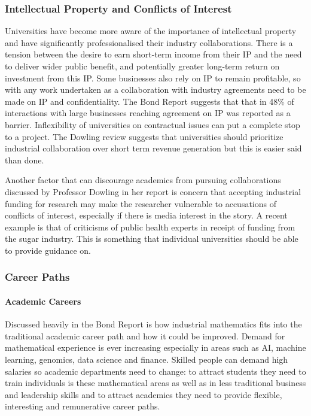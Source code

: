 \documentclass[11pt]{article} %
\begin{document}
	\subsubsection{Intellectual Property and Conflicts of Interest} 
	Universities have  become more aware of the importance of intellectual property and have significantly professionalised their industry collaborations. There is a tension between the desire to earn short-term income from their IP and the need to deliver wider public benefit, and potentially greater long-term return on investment from this IP. Some businesses also rely on IP to remain profitable, so with any work undertaken as a collaboration with industry agreements need to be made on IP and confidentiality. The Bond Report \cite{Bond} suggests that that in 48\% of interactions with large businesses reaching agreement on IP was reported as a barrier.   Inflexibility of universities on contractual issues can put a complete stop to a project.  The Dowling review \cite{DOWLING2015} suggests that universities should prioritize industrial collaboration over short term revenue generation but this is easier said than done. 
	
	Another factor that can discourage academics from pursuing collaborations  discussed by Professor Dowling in her report \cite{DOWLING2015} is concern that accepting industrial funding for research may make the researcher vulnerable to accusations of conflicts of interest, especially if there is media interest in the story. A recent example is that of  criticisms of public health experts in receipt of funding from the sugar industry. This is something that individual universities should be able to provide guidance on. 
	\subsubsection{Career Paths} 
	\paragraph{Academic Careers}
	
	
	Discussed heavily in the Bond Report is  how industrial mathematics fits into the traditional academic career path and how it could be improved. Demand for mathematical experience is ever increasing especially in areas such as AI, machine learning, genomics, data science and finance. Skilled people can demand high salaries so academic departments need to change: to attract students they need to train individuals is these mathematical areas as well as in less traditional business and leadership skills and to attract academics they need to provide flexible, interesting  and remunerative career paths.
	
\end{document}
